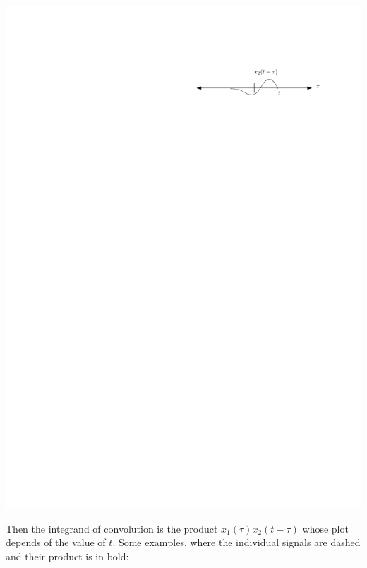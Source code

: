 \begin{center}
  \includegraphics[scale=1]{graphics/convolution-explain3.pdf}
\end{center}
Then the integrand of convolution is the product $x_1(\tau)x_2(t-\tau)$ whose plot depends of the value of $t$. Some examples, where the individual signals are dashed and their product is in bold:

